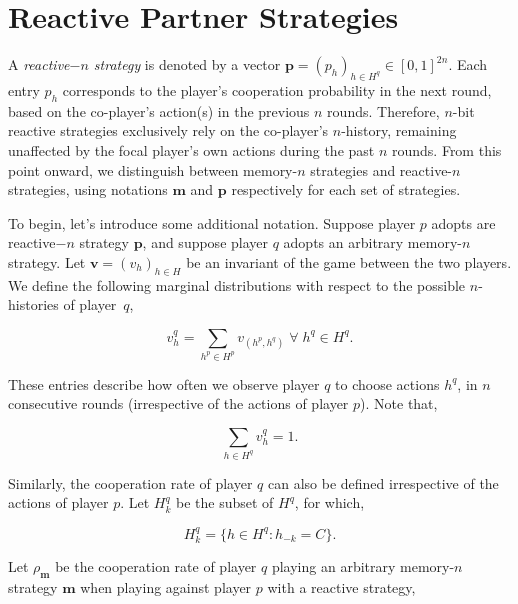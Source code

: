 \documentclass{article}
\theoremstyle{definition}
\begin{document}
\section{Reactive Partner Strategies}\label{section:reactive_strategies}

A {\it reactive$-n$ strategy} is denoted by a vector
$\mathbf{p}=(p_h)_{h\in H^q}\in[0,1]^{2n}$. Each entry $p_h$ corresponds to the
player's cooperation probability in the next round, based on the co-player's
action(s) in the previous $n$ rounds. Therefore, $n$-bit reactive strategies
exclusively rely on the co-player's $n$-history, remaining unaffected by the
focal player's own actions during the past $n$ rounds. From this point onward,
we distinguish between memory-$n$ strategies and reactive-$n$ strategies, using
notations $\mathbf{m}$ and $\mathbf{p}$ respectively for each set of strategies.

To begin, let's introduce some additional notation. Suppose player $p$ adopts
are reactive$-n$ strategy $\mathbf{p}$, and suppose player $q$ adopts an
arbitrary memory-$n$ strategy. Let $\mathbf{v}=(v_h)_{h\in H}$ be an invariant
of the game between the two players. We define the following marginal
distributions with respect to the possible $n$-histories of player~$q$,

\begin{equation}\label{Eq:marginal_distributions}
\displaystyle v^q_{h} = \sum_{h^p\in H^p} v_{(h^p,h^q)} \; \forall \; h^q \in H^q.
\end{equation}

These entries describe how often we observe player $q$ to choose actions $h^q$,
in $n$ consecutive rounds (irrespective of the actions of player $p$).
Note that,

\begin{equation}\label{eq:normalization_marginal_distributions}
  \displaystyle \sum_{h \in H^q} v^q_{h} = 1.
\end{equation}

Similarly, the cooperation rate of player $q$ can also be defined irrespective
of the actions of player $p$. Let $H^{q}_{k}$ be the subset of $H^{q}$, for which,

\begin{equation}
  H^{q}_{k} = \{h \in H^q : h_{-k} = C\}.
\end{equation}

Let $\rho_\mathbf{m}$ be the cooperation rate of
player $q$ playing an arbitrary memory-$n$ strategy $\mathbf{m}$ when playing
against player $p$ with a reactive strategy,
\end{document}
